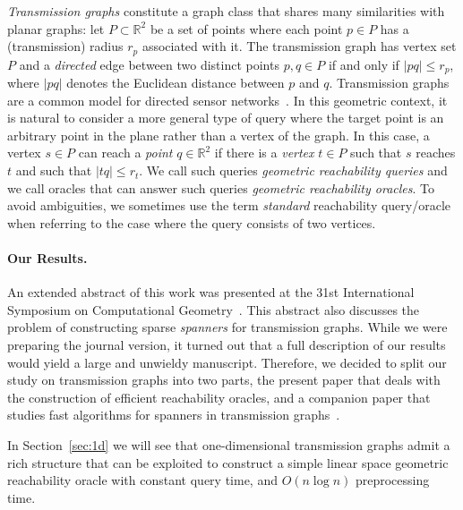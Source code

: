 \documentclass[11pt,a4paper]{paper}
\newcommand{\mathset}[1]{\ensuremath {\mathbb {#1}}}
\newcommand{\R}{\mathset{R}}
\begin{document}
\emph{Transmission graphs} constitute a graph class that shares many
similarities with planar graphs:
let $P \subset
\R^2$ be a set of points where each point $p \in P$ has a (transmission) radius
$r_p$ associated
with it. The transmission graph has vertex set $P$ and a
\emph{directed} edge between two distinct points $p,q \in P$ if and only if
$|pq| \leq r_p$,
where $|pq|$ denotes the Euclidean distance between $p$ and $q$. 
Transmission graphs are a common model for directed sensor 
networks~\cite{KaplanEtAl15,PelegRoditty10,RickenbachEtAl09}.
In this geometric context, it is natural to consider a more general
type of query where the target point is an arbitrary point in the plane 
rather than a vertex of the graph. In this case, a vertex $s \in P$ can 
reach a \emph{point} $q \in \R^2$ if there is a \emph{vertex} $t \in P$ 
such that $s$ reaches $t$ and such that $|tq| \leq r_t$. We call such 
queries \emph{geometric reachability queries} and we call oracles that 
can answer such queries \emph{geometric reachability oracles}. To avoid
ambiguities, we sometimes use the term \emph{standard} reachability 
query/oracle when referring to the case where the query consists of 
two vertices.

\paragraph*{Our Results.}
An extended abstract of this work was presented
at the 31st International Symposium on Computational
Geometry~\cite{KaplanMuRoSe15}. 
This abstract also discusses the problem of constructing
sparse \emph{spanners} for transmission graphs. While we were preparing the
journal version, it turned out that a full description of 
our results would yield a large and unwieldy manuscript. Therefore,
we decided to split our study on transmission graphs into two parts,
the present paper that deals with the construction of efficient 
reachability oracles, and a companion paper that studies fast algorithms
for spanners in transmission graphs~\cite{KaplanEtAl15}.

In Section~\ref{sec:1d} we will see that one-dimensional 
transmission graphs
admit a rich structure that
can be exploited to construct a simple linear space geometric reachability
oracle with constant query time, and  $O(n \log n)$ preprocessing time.
\end{document}
